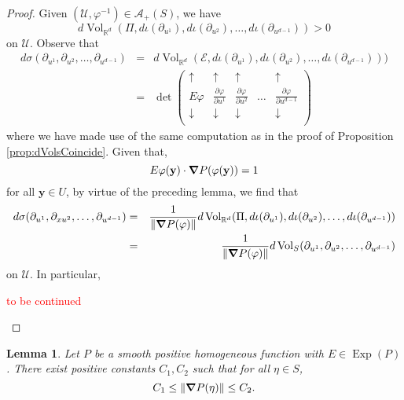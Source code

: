 \documentclass{article}
\newcommand\Exp{\operatorname{Exp}}
\renewcommand\det{\operatorname{det}}
\newcommand{\p}{\partial}
\newcommand{\f}[2]{\frac{#1}{#2}}
\theoremstyle{theorem}
\newtheorem{lemma}[theorem]{Lemma}
\newcommand{\Vol}{\operatorname{Vol}}
\begin{document}
\begin{proof}
Given $(\mathcal{U},\varphi^{-1})\in\mathcal{A}_+(S)$, we have
\begin{equation*}
d\Vol_{\mathbb{R}^d}(\Pi,d\iota (\partial_{u^1}), d\iota(\partial_{u^2}),\dots,d\iota(\partial_{u^{d-1}}))>0
\end{equation*}
on $\mathcal{U}$. Observe that
\begin{eqnarray*}
d\sigma(\partial_{u^1},\partial_{u^2},\dots,\partial_{u^{d-1}}) &=& d\Vol_{\mathbb{R}^d}(\mathcal{E},d\iota(\partial_{u^1}),d\iota(\partial_{u^2}),\dots,d\iota(\partial_{u^{d-1}})))\\ 
&=& \det\begin{pmatrix}
    \uparrow & \uparrow & \uparrow & & \uparrow\\
    E \varphi & \f{\p\varphi}{\p u^1} & \f{\p\varphi}{\p u^2} & \dots & \f{\p\varphi}{\p u^{d-1}}  \\
    \downarrow & \downarrow & \downarrow & & \downarrow\\
    \end{pmatrix}
\end{eqnarray*}
where we have made use of the same computation as in the proof of Proposition \ref{prop:dVolsCoincide}. Given that,
\begin{equation*}
E\varphi(\mathbf{y})\cdot \grad P(\varphi(\mathbf{y}))=1
\end{equation*}
for all $\mathbf{y}\in U$, by virtue of the preceding lemma, we find that
\begin{eqnarray*}
d\sigma(\partial_{u^1},\partial_{xu^2},\dots,\partial_{u^{d-1}})&=&\frac{1}{\norm{\grad P(\varphi) }}d\Vol_{\mathbb{R}^d}(\Pi,d\iota(\partial_{u^1}),d\iota(\partial_{u^2}),\dots,d\iota(\partial_{u^{d-1}})) \\
&=&\frac{1}{\norm{\grad P(\varphi) }}  d\Vol_S(\partial_{u^1},\partial_{u^2},\dots,\partial_{u^{d-1}})
\end{eqnarray*}
on $\mathcal{U}$. In particular, 

\begin{framed}
\textcolor{red}{to be continued}
\end{framed}

\end{proof}







\begin{lemma}\label{lem:boundsGradP}
Let $P$ be a smooth positive homogeneous function with $E \in \Exp(P)$. There exist positive constants $C_1,C_2$ such that for all $\eta\in S$, 
\begin{equation*}
    C_1 \leq \norm{\grad P(\eta)} \leq C_2.
\end{equation*}
\end{lemma}
\end{document}
